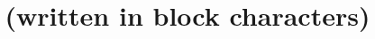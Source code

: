 \documentclass{tubitak2219fpafr} %
\title{(written in block characters)}
\begin{document}
\hepsibukadar
\end{document}
